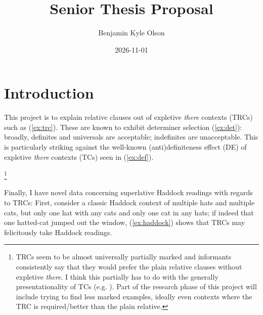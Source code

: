 \documentclass[11pt]{article}
\title{Senior Thesis Proposal}
\author{Benjamin Kyle Olson}
\date{2026-11-01}
\begin{document}
\maketitle

\section{Introduction}

This project is to explain relative clauses out of expletive \textit{there} contexts (TRCs) such as (\ref{ex:trc}). These are known to exhibit determiner selection (\ref{ex:det}): broadly, definites and universals are acceptable; indefinites are unacceptable. This is particularly striking against the well-known (anti)definiteness effect (DE) of expletive \textit{there} contexts (TCs) seen in (\ref{ex:def}).

\begin{exe}
	\label{ex:trc}\footnote{TRCs seem to be almost universally partially marked and informants consistently say that they would prefer the plain relative clauses without expletive \textit{there}. I think this partially has to do with the generally presentationality of TCs (e.g. \cite{zucchiIngredientsDefinitenessDefiniteness1995}). Part of the research phase of this project will include trying to find less marked examples, ideally even contexts where the TRC is required/better than the plain relative.}
	\label{ex:det}
	\label{ex:def}
\end{exe}

Finally, I have novel data concerning superlative Haddock readings with regards to TRCs: First, consider a classic Haddock context of multiple hats and multiple cats, but only one hat with any cats and only one cat in any hats; if indeed that one hatted-cat jumped out the window, (\ref{ex:haddock}) shows that TRCs may felicitously take Haddock readings.
\end{document}
